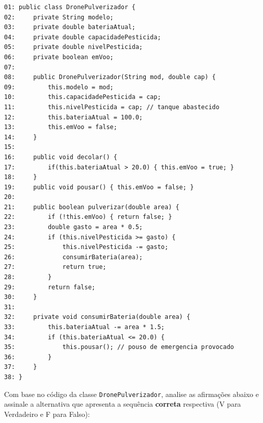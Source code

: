 \documentclass[12pt,a4paper]{article}
\begin{document}
\begin{enumerate}
\begin{center}
    \end{center}
\begin{small}
\begin{lstlisting}
01: public class DronePulverizador {
02:     private String modelo;
03:     private double bateriaAtual;
04:     private double capacidadePesticida;
05:     private double nivelPesticida;
06:     private boolean emVoo;
07: 
08:     public DronePulverizador(String mod, double cap) {
09:         this.modelo = mod;
10:         this.capacidadePesticida = cap;
11:         this.nivelPesticida = cap; // tanque abastecido
12:         this.bateriaAtual = 100.0;
13:         this.emVoo = false;
14:     }
15: 
16:     public void decolar() { 
17:         if(this.bateriaAtual > 20.0) { this.emVoo = true; }
18:     }
19:     public void pousar() { this.emVoo = false; }
20: 
21:     public boolean pulverizar(double area) {
22:         if (!this.emVoo) { return false; }
23:         double gasto = area * 0.5;
24:         if (this.nivelPesticida >= gasto) {
25:             this.nivelPesticida -= gasto;
26:             consumirBateria(area);
27:             return true;
28:         }
29:         return false;
30:     }
31: 
32:     private void consumirBateria(double area) {
33:         this.bateriaAtual -= area * 1.5;
34:         if (this.bateriaAtual <= 20.0) {
35:             this.pousar(); // pouso de emergencia provocado
36:         }
37:     }
38: }
\end{lstlisting}
\end{small}

    Com base no código da classe \texttt{DronePulverizador}, analise as afirmações abaixo e assinale a alternativa que apresenta a sequência \textbf{correta} respectiva (V para Verdadeiro e F para Falso):


\end{enumerate}
\end{document}
